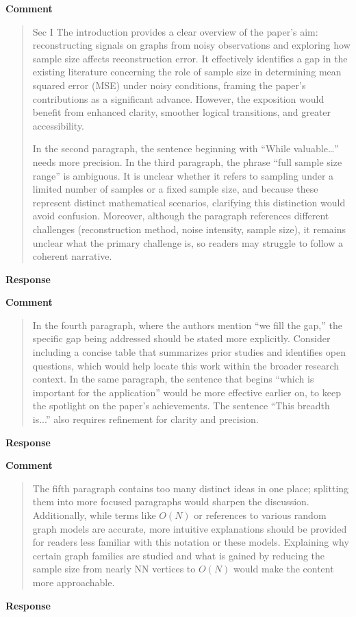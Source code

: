 \documentclass[11pt,onecolumn,journal]{IEEEtran}
\begin{document}
\textbf{Comment}
\begin{quote}
Sec I
The introduction provides a clear overview of the paper’s aim: reconstructing signals on graphs from noisy observations and exploring how sample size affects reconstruction error. It effectively identifies a gap in the existing literature concerning the role of sample size in determining mean squared error (MSE) under noisy conditions, framing the paper’s contributions as a significant advance. However, the exposition would benefit from enhanced clarity, smoother logical transitions, and greater accessibility.

In the second paragraph, the sentence beginning with “While valuable…” needs more precision. In the third paragraph, the phrase “full sample size range” is ambiguous. It is unclear whether it refers to sampling under a limited number of samples or a fixed sample size, and because these represent distinct mathematical scenarios, clarifying this distinction would avoid confusion. Moreover, although the paragraph references different challenges (reconstruction method, noise intensity, sample size), it remains unclear what the primary challenge is, so readers may struggle to follow a coherent narrative.
\end{quote}
\textbf{Response}


\textbf{Comment}
\begin{quote}

In the fourth paragraph, where the authors mention “we fill the gap,” the specific gap being addressed should be stated more explicitly. Consider including a concise table that summarizes prior studies and identifies open questions, which would help locate this work within the broader research context. In the same paragraph, the sentence that begins “which is important for the application” would be more effective earlier on, to keep the spotlight on the paper’s achievements. The sentence “This breadth is...” also requires refinement for clarity and precision.

\end{quote}
\textbf{Response}


\textbf{Comment}
\begin{quote}
The fifth paragraph contains too many distinct ideas in one place; splitting them into more focused paragraphs would sharpen the discussion. Additionally, while terms like $O(N)$ or references to various random graph models are accurate, more intuitive explanations should be provided for readers less familiar with this notation or these models. Explaining why certain graph families are studied and what is gained by reducing the sample size from nearly NN vertices to $O(N)$ would make the content more approachable.

\end{quote}
\textbf{Response}
\end{document}
